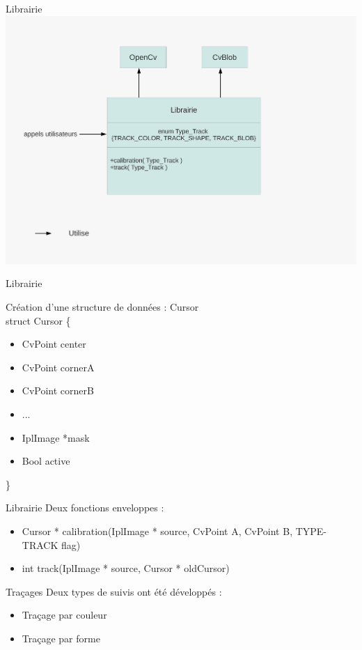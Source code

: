 \documentclass{beamer}
\begin{document}
		\begin{frame}{Librairie}
			\includegraphics[scale=0.40]{schema-librairie.pdf}
		\end{frame}

		\begin{frame}{Librairie}

		Création d'une structure de données : Cursor\\
		struct Cursor \{
		\begin{itemize}
			\item{CvPoint center}
			\item{CvPoint cornerA}
			\item{CvPoint cornerB}
			\item{...}
			\item{IplImage *mask}
			\item{Bool active}
		\end{itemize}
		\} \\
		\end{frame}
		
		\begin{frame}{Librairie}
		Deux fonctions enveloppes : \\
			\begin{itemize}
				\item{Cursor * calibration(IplImage * source, CvPoint A, CvPoint B, TYPE-TRACK flag)}
				\item{int track(IplImage * source, Cursor * oldCursor)}
			\end{itemize}		
		\end{frame}

		\begin{frame}{Traçages}
		Deux types de suivis ont été développés : \\
			\begin{itemize}
				\item{Traçage par couleur}
				\item{Traçage par forme}
			\end{itemize}
		\end{frame}
\end{document}
